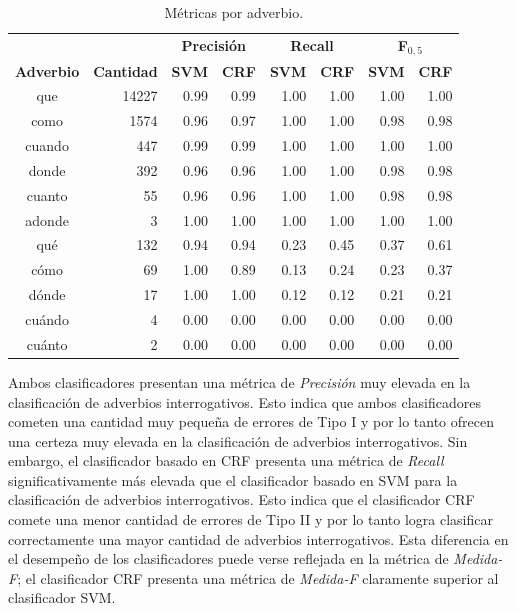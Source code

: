 \documentclass[runningheads,a4paper]{llncs}
\begin{document}
\begin{table}[ht]
 	\renewcommand{\arraystretch}{1.3}
	\renewcommand{\tabcolsep}{3pt}
	\caption{Métricas por adverbio.}
	\label{table:metricas-adv}
	\centering
	\begin{tabular}{c r r r r r r r}
		\hline
		\multicolumn{2}{c}{} 
			& \multicolumn{2}{c}{\textbf{Precisión}} 
			& \multicolumn{2}{c}{\textbf{Recall}} 
			& \multicolumn{2}{c}{\textbf{F$_{0,5}$}} \\
		\multicolumn{1}{c}{\textbf{Adverbio}} & \multicolumn{1}{c}{\textbf{Cantidad}}
			& \multicolumn{1}{r}{\textbf{SVM}} & \multicolumn{1}{r}{\textbf{CRF}}
			& \multicolumn{1}{r}{\textbf{SVM}} & \multicolumn{1}{r}{\textbf{CRF}}
			& \multicolumn{1}{r}{\textbf{SVM}} & \multicolumn{1}{r}{\textbf{CRF}} \\		
		\hline\hline
		que & 14227 & 0.99 & 0.99 & 1.00 & 1.00 & 1.00 & 1.00 \\
		como & 1574 & 0.96 & 0.97 & 1.00 & 1.00 & 0.98 & 0.98 \\
		cuando & 447 & 0.99 & 0.99 & 1.00 & 1.00 & 1.00 & 1.00 \\
		donde & 392 & 0.96 & 0.96 & 1.00 & 1.00 & 0.98 & 0.98 \\
		cuanto & 55 & 0.96 & 0.96 & 1.00 & 1.00 & 0.98 & 0.98 \\
		adonde & 3 & 1.00 & 1.00 & 1.00 & 1.00 & 1.00 & 1.00 \\
		\hline
		qué & 132 & 0.94 & 0.94 & 0.23 & 0.45 & 0.37 & 0.61 \\
		cómo & 69 & 1.00 & 0.89 & 0.13 & 0.24 & 0.23 & 0.37 \\
		dónde & 17 & 1.00 & 1.00 & 0.12 & 0.12 & 0.21 & 0.21 \\
		cuándo & 4 & 0.00 & 0.00 & 0.00 & 0.00 & 0.00 & 0.00 \\
		cuánto & 2 & 0.00 & 0.00 & 0.00 & 0.00 & 0.00 & 0.00 \\
		\hline
	\end{tabular}
\end{table}

Ambos clasificadores presentan una métrica de \emph{Precisión} muy elevada en la clasificación de adverbios interrogativos. Esto indica que ambos clasificadores cometen una cantidad muy pequeña de errores de Tipo I y por lo tanto ofrecen una certeza muy elevada en la clasificación de adverbios interrogativos. Sin embargo, el clasificador basado en CRF presenta una m\'etrica de \emph{Recall} significativamente m\'as elevada que el clasificador basado en SVM para la clasificaci\'on de adverbios interrogativos. Esto indica que el clasificador CRF comete una menor cantidad de errores de Tipo II y por lo tanto logra clasificar correctamente una mayor cantidad de adverbios interrogativos. Esta diferencia en el desempeño de los clasificadores puede verse reflejada en la m\'etrica de \emph{Medida-F}; el clasificador CRF presenta una m\'etrica de \emph{Medida-F} claramente superior al clasificador SVM.
\end{document}
